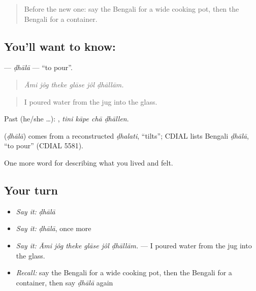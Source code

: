 \begin{quote}
Before the new one: say the Bengali for a wide cooking pot, then the Bengali for a container.
\end{quote}

\subsection*{You'll want to know: }
\textbf{} — \emph{ḍhālā} — \textquotedblleft{}to pour\textquotedblright{}.

\begin{quote}
     
\end{quote}

\begin{quote}
\emph{Āmi jôg theke glāse jôl ḍhāllām.}
\end{quote}

\begin{quote}
I poured water from the jug into the glass.
\end{quote}

Past (he/she …):    , \emph{tini kāpe chā ḍhāllen}.

\begin{cousinweb}
\textbf{} (\emph{ḍhālā}) comes from a reconstructed \emph{ḍhalati}, \textquotedblleft{}tilts\textquotedblright{}; CDIAL lists Bengali \emph{ḍhālā}, \textquotedblleft{}to pour\textquotedblright{} (CDIAL 5581).
\end{cousinweb}

\begin{grammarlens}[title={What you've built}]
One more word for describing what you lived and felt.
\end{grammarlens}

\subsection*{Your turn}
\begin{itemize}
\raggedright
  \item \emph{Say it:} \emph{ḍhālā}
  \item \emph{Say it:} \emph{ḍhālā}, once more
  \item \emph{Say it:} \emph{Āmi jôg theke glāse jôl ḍhāllām.} — I poured water from the jug into the glass.
  \item \emph{Recall:} say the Bengali for a wide cooking pot, then the Bengali for a container, then say \emph{ḍhālā} again
\end{itemize}

